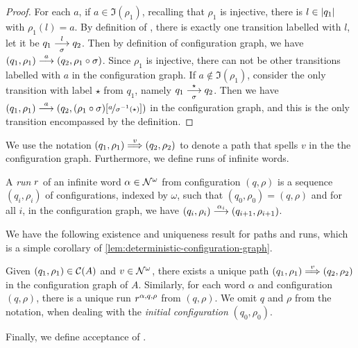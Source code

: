 \begin{proof}
 For each $a$, if $a \in \Im(\rho_1)$, recalling that $\rho_1$ is injective, there is $l \in |q_1|$ with $\rho_1(l) = a$. By definition of \hdma, there is exactly one transition labelled with $l$, let it be $q_1 \overset{l}{\underset{\sigma}{\longrightarrow}} q_2$. Then by definition of configuration graph, we have $(q_1,\rho_1) \overset{a}{\longrightarrow} (q_2,\rho_1 \circ \sigma)$. Since $\rho_1$ is injective, there can not be other transitions labelled with $a$ in the configuration graph. If $a \notin \Im(\rho_1)$, consider the only transition with label $\star$ from $q_1$, namely $q_1 \overset{\star}{\underset{\sigma}{\longrightarrow}} q_2$.  Then we have $(q_1,\rho_1) \overset{a}{\longrightarrow} (q_2,(\rho_1 \circ \sigma)[\nicefrac{a}{\sigma^{-1}(\star)}])$ in the configuration graph, and this is the only transition encompassed by the definition.
\end{proof}

\noindent We use the notation $(q_1,\rho_1) \overset{v}{\Longrightarrow} (q_2,\rho_2)$ to denote a path that spells $v$ in the the configuration graph. Furthermore, we define runs of infinite words.
%

\begin{definition}
 A \emph{run} $r$ of an infinite word $\alpha \in \mathcal{N}^\omega$ from configuration $(q,\rho)$ is a sequence $(q_i,\rho_i)$ of configurations, indexed by $\omega$, such that $(q_0,\rho_0)=(q,\rho)$ and for all $i$, in the configuration graph, we have $(q_i,\rho_i) \overset{\alpha_i}{\longrightarrow} (q_{i+1},\rho_{i+1})$. 
\end{definition}

\noindent We have the following existence and uniqueness result for paths and runs, which is a simple corollary of  \cref{lem:deterministic-configuration-graph}.

\begin{proposition}
\label{prop:unique-path}
Given $(q_1,\rho_1) \in \mathcal{C}(A)$ and $v \in \mathcal{N}^\omega$, there exists a unique path $(q_1,\rho_1) \overset{v}{\Longrightarrow} (q_2,\rho_2)$ in the configuration graph of $A$. Similarly, for each word $\alpha$ and configuration $(q,\rho)$, there is a unique run $r^{\alpha,q,\rho}$ from $(q,\rho)$. We omit $q$ and $\rho$ from the notation, when dealing with the \emph{initial configuration} $(q_0,\rho_0)$.
\end{proposition}

\noindent Finally, we define acceptance of \hdmas. 

